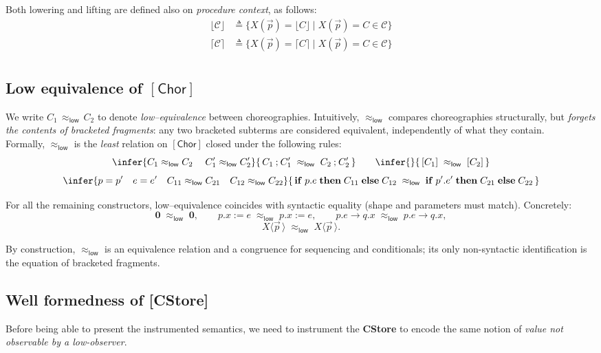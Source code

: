 \documentclass[12pt,a4paper,twoside]{book}
\begin{document}
Both lowering and lifting are defined also on \emph{procedure context}, as follows:
\begin{align*}
	\lfloor \mathscr{C} \rfloor &\triangleq
\{X(\vec{p}) = \lfloor C \rfloor \mid X(\vec{p}) = C \in \mathscr{C}\}\\
	\lceil \mathscr{C} \rceil &\triangleq
\{X(\vec{p}) = \lceil C \rceil \mid X(\vec{p}) = C \in \mathscr{C}\}\\
\end{align*}

\subsection{Low equivalence of $\mathsf{[Chor]}$}
We write \(C_1 \,\approx_{\mathsf{low}}\, C_2\) to denote \emph{low–equivalence} between choreographies.
Intuitively, \(\approx_{\mathsf{low}}\) compares choreographies structurally, but \emph{forgets the
contents of bracketed fragments}: any two bracketed subterms are considered equivalent,
independently of what they contain.\\
Formally, \(\approx_{\mathsf{low}}\) is the \emph{least} relation on \(\mathsf{[Chor]}\) closed under the following rules:
\[
\infer
  {C_1 \approx_{\mathsf{low}} C_2 \quad\; C_1' \approx_{\mathsf{low}} C_2'}
  {\,C_1 \mathbin{;} C_1' \;\approx_{\mathsf{low}}\; C_2 \mathbin{;} C_2'\,}
\qquad
\infer
  {}
  {\,[C_1] \;\approx_{\mathsf{low}}\; [C_2]\,}
\]
\[
\infer
 {p = p' \quad e = e' \quad C_{11} \approx_{\mathsf{low}} C_{21} \quad C_{12} \approx_{\mathsf{low}} C_{22}}
 {\,\mathbf{if}\; p.e\; \mathbf{then}\; C_{11}\; \mathbf{else}\; C_{12}
   \;\approx_{\mathsf{low}}\;
   \mathbf{if}\; p'.e'\; \mathbf{then}\; C_{21}\; \mathbf{else}\; C_{22}\,}
\]

\noindent For all the remaining constructors, low–equivalence coincides with syntactic equality (shape and parameters must match). Concretely:
\[
\boldsymbol{0} \;\approx_{\mathsf{low}}\; \boldsymbol{0},\qquad
p.x \mathrel{:=} e \;\approx_{\mathsf{low}}\; p.x \mathrel{:=} e,\qquad
p.e \rightarrow q.x \;\approx_{\mathsf{low}}\; p.e \rightarrow q.x,
\]
\[
X\langle \vec{p}\,\rangle \;\approx_{\mathsf{low}}\; X\langle \vec{p}\,\rangle.
\]

By construction, \(\approx_{\mathsf{low}}\) is an equivalence relation and a congruence
for sequencing and conditionals; its only non-syntactic identification is the equation of  bracketed fragments.

\subsection{Well formedness of \textbf{[CStore]}}
Before being able to present the instrumented semantics, we need to instrument the \textbf{CStore} to encode the same notion of \emph{value not observable by a low-observer}.
\end{document}
